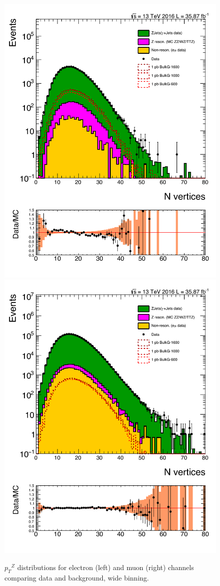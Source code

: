\begin{figure}[htbp!]
\centering
\includegraphics[width=0.46\linewidth,page=9]{figures/ReMiniSummer16_DT_PhReMiniMCRcFixXsec_GMCPhPtWt_tightzpt50_puWeightsummer16_muoneg_gjet_metfilter_unblind_el_log_1pb.pdf}
\includegraphics[width=0.46\linewidth,page=9]{figures/ReMiniSummer16_DT_PhReMiniMCRcFixXsec_GMCPhPtWt_tightzpt50_puWeightsummer16_muoneg_gjet_metfilter_unblind_mu_log_1pb.pdf}
\caption{${p_T}^Z$ distributions for electron (left) and muon (right) channels
comparing data and background,
wide binning.}
\label{fig:gjet_zpt_wide}
\end{figure}

